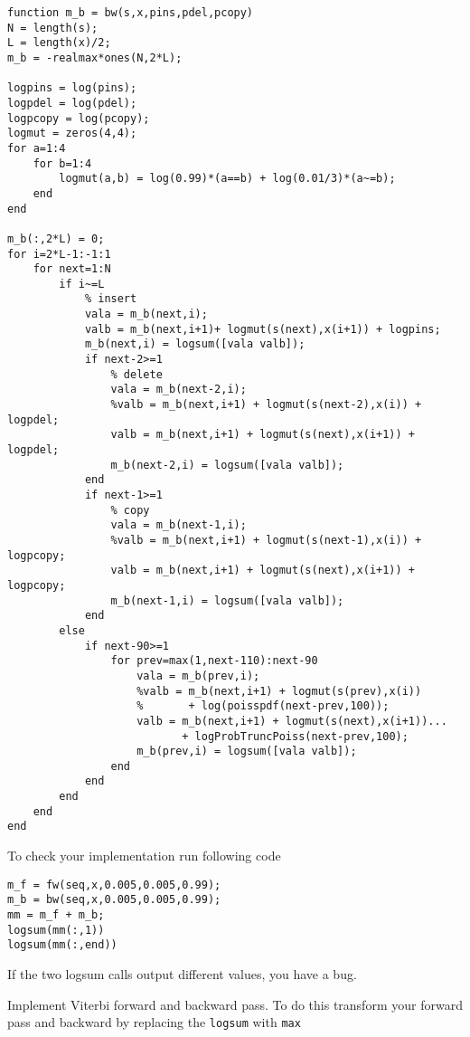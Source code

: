 \documentclass{article}
\begin{document}
\begin{verbatim}
function m_b = bw(s,x,pins,pdel,pcopy)
N = length(s);
L = length(x)/2;
m_b = -realmax*ones(N,2*L);

logpins = log(pins);
logpdel = log(pdel);
logpcopy = log(pcopy);
logmut = zeros(4,4);
for a=1:4
    for b=1:4
        logmut(a,b) = log(0.99)*(a==b) + log(0.01/3)*(a~=b);
    end
end

m_b(:,2*L) = 0;
for i=2*L-1:-1:1
    for next=1:N
        if i~=L
            % insert
            vala = m_b(next,i);
            valb = m_b(next,i+1)+ logmut(s(next),x(i+1)) + logpins;
            m_b(next,i) = logsum([vala valb]);
            if next-2>=1
                % delete
                vala = m_b(next-2,i);
                %valb = m_b(next,i+1) + logmut(s(next-2),x(i)) + logpdel;
                valb = m_b(next,i+1) + logmut(s(next),x(i+1)) + logpdel;
                m_b(next-2,i) = logsum([vala valb]);
            end
            if next-1>=1
                % copy
                vala = m_b(next-1,i);
                %valb = m_b(next,i+1) + logmut(s(next-1),x(i)) + logpcopy;
                valb = m_b(next,i+1) + logmut(s(next),x(i+1)) + logpcopy;
                m_b(next-1,i) = logsum([vala valb]);
            end
        else
            if next-90>=1
                for prev=max(1,next-110):next-90
                    vala = m_b(prev,i);
                    %valb = m_b(next,i+1) + logmut(s(prev),x(i)) 
                    %       + log(poisspdf(next-prev,100));
                    valb = m_b(next,i+1) + logmut(s(next),x(i+1))...
                           + logProbTruncPoiss(next-prev,100);
                    m_b(prev,i) = logsum([vala valb]);
                end
            end
        end
    end
end
\end{verbatim}
To check your implementation run following code
\begin{verbatim}
m_f = fw(seq,x,0.005,0.005,0.99);
m_b = bw(seq,x,0.005,0.005,0.99);
mm = m_f + m_b;
logsum(mm(:,1))
logsum(mm(:,end))
\end{verbatim}
If the two logsum calls output different values, you have a bug.

\newproblem{3pt} Implement Viterbi forward and backward pass. To do this transform your forward pass and backward by replacing the {\tt logsum} with {\tt max}
\end{document}
